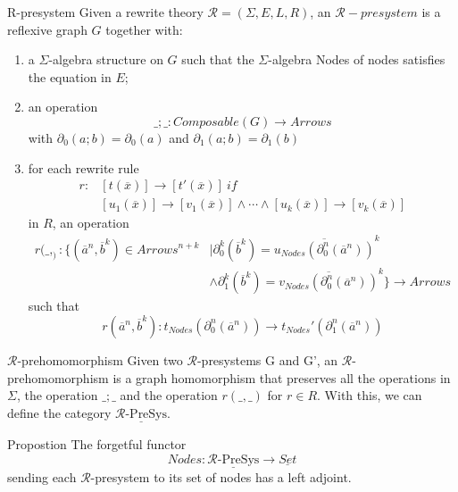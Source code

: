 \documentclass{beamer}
\begin{document}
\begin{frame}
    \scriptsize
    \begin{block}{R-presystem}
        Given a rewrite theory $\mathcal{R} = (\Sigma, E, L, R)$, an $\mathcal{R}-presystem$
        is a reflexive graph $G$ together with: \begin{enumerate}
            \item a $\Sigma$-algebra structure on $G$ such that the $\Sigma$-algebra Nodes of nodes
            satisfies the equation in $E$;
            \item an operation 
            $$ \_;\_ : Composable(G) \rightarrow Arrows$$
            with $\partial_0(a;b) = \partial_0(a)$ and $\partial_1(a;b) = \partial_1(b)$
            \item for each rewrite rule 
            \begin{align*}
                r:&[t(\overline{x})] \rightarrow [t'(\overline{x})]\ if \\ 
                &[u_1(\overline{x})] \rightarrow [v_1(\overline{x})] \wedge \cdots \wedge [u_k(\overline{x})] \rightarrow [v_k(\overline{x})] 
            \end{align*}
            in $R$, an operation  
            \begin{align*}
                r(\_,_) : \{(\overline{a}^n,\overline{b}^k) \in Arrows^{n+k}& 
                | \partial_0^k(\overline{b}^k) = \overline{u_{Nodes}(\partial_0^n(\overline{a}^n))}^k \\
                &\wedge  \partial_1^k(\overline{b}^k) = \overline{v_{Nodes}(\partial_0^n(\overline{a}^n))}^k\} \rightarrow Arrows
            \end{align*}
        such that $$ r(\overline{a}^n,\overline{b}^k) : t_{Nodes}(\partial_0^n(\overline{a}^n)) \rightarrow t_{Nodes}'(\partial_1^n(\overline{a}^n))$$
        \end{enumerate}
    \end{block}
\end{frame}
\begin{frame}
    \small
    \begin{block}{$\mathcal{R}$-prehomomorphism}
        Given two $\mathcal{R}$-presystems G and G', an $\mathcal{R}$-prehomomorphism is a 
        graph homomorphism that preserves all the operations in $\Sigma$, the operation $\_;\_$ and the operation $r(\_,\_)$ for $r \in R$.
        With this, we can define the category $\underline{\mathcal{R}\text{-PreSys}}$.
    \end{block}
    
    \pause
    \begin{block}{Propostion}
        The forgetful functor 
        $$Nodes: \underline{\mathcal{R}\text{-PreSys}} \rightarrow \underline{Set}$$
        sending each $\mathcal{R}$-presystem to its set of nodes has a left adjoint.
    \end{block}
\end{frame}
\end{document}
